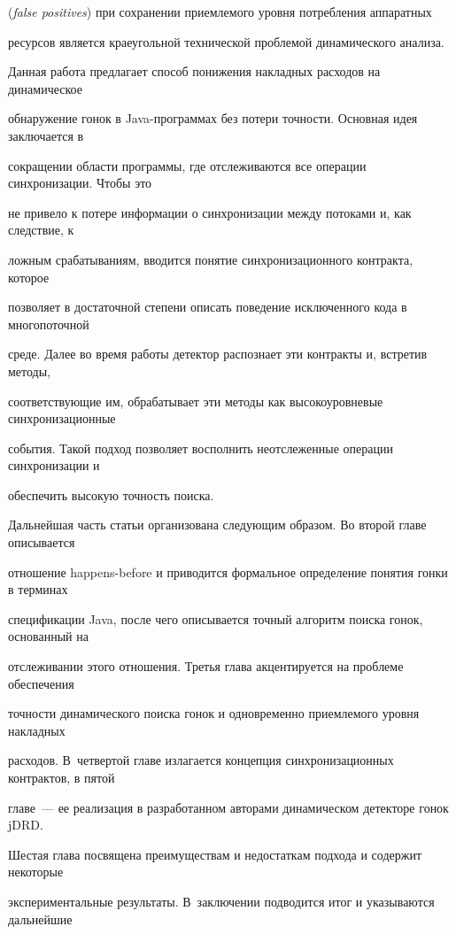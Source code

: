 (\textit{false positives}) при сохранении приемлемого уровня потребления аппаратных

ресурсов является краеугольной технической проблемой динамического анализа.



  Данная работа предлагает способ понижения накладных расходов на динамическое

обнаружение гонок в Java-про\-грам\-мах без потери точности. Основная идея заключается в

сокращении области программы, где отслеживаются все операции синхронизации. Чтобы это

не привело к потере информации о синхронизации между потоками и, как следствие, к

ложным срабатываниям, вводится понятие синхронизационного контракта, которое

позволяет в достаточной степени описать поведение исключенного кода в многопоточной

среде. Далее во время работы детектор распознает эти контракты и, встретив методы,

соответствующие им, обрабатывает эти методы как высокоуровневые синхронизационные

события. Такой подход позволяет восполнить неотслеженные операции синхронизации и

обеспечить высокую точность поиска.



  Дальнейшая часть статьи организована следующим образом. Во второй главе описывается

отношение happens-before и приводится формальное определение понятия гонки в терминах

спецификации Java, после чего описывается точный алгоритм поиска гонок, основанный на

отслеживании этого отношения. Третья глава акцентируется на проблеме обеспечения

точности динамического поиска гонок и одновременно приемлемого уровня накладных

расходов. В~четвертой главе излагается концепция синхронизационных контрактов, в пятой

главе~--- ее реализация в разработанном авторами динамическом детекторе гонок jDRD.

Шестая глава посвящена преимуществам и недостаткам подхода и содержит некоторые

экспериментальные результаты. В~заключении подводится итог и указываются дальнейшие

